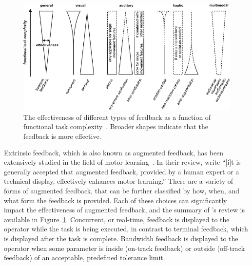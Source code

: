 \begin{figure}[!b]
    \begin{center}
        \includegraphics[width=\linewidth]{figures/Introduction/sigrist_review.png}
        \caption[The effectiveness of different types of feedback as a function of functional task complexity]{The effectiveness of different types of feedback as a function of functional task complexity~\citep{sigrist_augmented_2013}. Broader shapes indicate that the feedback is more effective.}
        \label{figure:sigrist_review}
    \end{center}
\end{figure}

Extrinsic feedback, which is also known as augmented feedback, has been extensively studied in the field of motor learning~\citep{sigrist_augmented_2013}.
In their \citeyear{sigrist_augmented_2013} review, \citeauthor{sigrist_augmented_2013} write ``[i]t is generally accepted that augmented feedback, provided by a human expert or a technical display, effectively enhances motor learning.''
There are a variety of forms of augmented feedback, that can be further classified by how, when, and what form the feedback is provided.
Each of these choices can significantly impact the effectiveness of augmented feedback, and the summary of \citeauthor{sigrist_augmented_2013}'s review is available in Figure~\ref{figure:sigrist_review}.
Concurrent, or real-time, feedback is displayed to the operator while the task is being executed, in contrast to terminal feedback, which is displayed after the task is complete.
Bandwidth feedback is displayed to the operator when some parameter is inside (on-track feedback) or outside (off-track feedback) of an acceptable, predefined tolerance limit.

